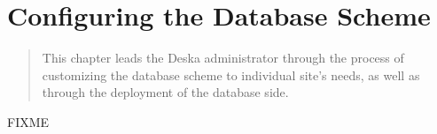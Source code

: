 \documentclass[deska]{subfiles}
\begin{document}
\chapter{Configuring the Database Scheme}
\label{sec:admin-dbscheme}

\begin{abstract}
This chapter leads the Deska administrator through the process of customizing the database scheme to individual site's
needs, as well as through the deployment of the database side.
\end{abstract}

FIXME
\end{document}
